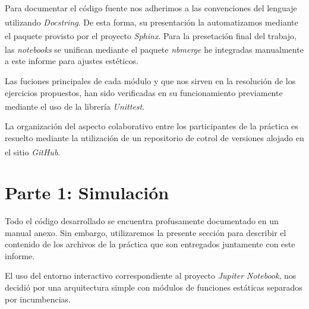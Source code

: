 \documentclass[11pt]{article}
\let\originalcite\cite
\renewcommand{\cite}[2][]{\textsuperscript{\originalcite{#2}}}
\begin{document}
Para documentar el código fuente nos adherimos a las 
convenciones del lenguaje utilizando \textit{Docstring}\cite{bib:doc}.
De esta forma, su presentación la automatizamos mediante el 
paquete provisto por el proyecto \textit{Sphinx}\cite{bib:sphinx}. Para la 
presetación final del trabajo, las \textit{notebooks} se 
unifican mediante el paquete \textit{nbmerge}\cite{bib:merge} he 
integradas manualmente a este informe para ajustes estéticos.

Las fuciones principales de cada módulo y que nos sirven en la 
resolución de los ejercicios propuestos, han sido verificadas
en su funcionamiento previamente mediante el uso de la librería 
\textit{Unittest}\cite{bib:test}.

La organización del aspecto colaborativo entre los participantes
de la práctica es resuelto mediante la utilización de un 
repositorio de cotrol de versiones alojado en el sitio 
\textit{GitHub}\cite{bib:git}.

\section{Parte 1: Simulación}

Todo el código desarrollado se encuentra profusamente documentado
en un manual anexo. Sin embargo, utilizaremos la presente
sección para describir el contenido de los archivos de la 
práctica que son entregados juntamente con este informe.

El uso del entorno interactivo correspondiente al proyecto
\textit{Jupiter Notebook}, nos decidió por una arquitectura 
simple con módulos de funciones estáticas separados por 
incumbencias.
\end{document}
